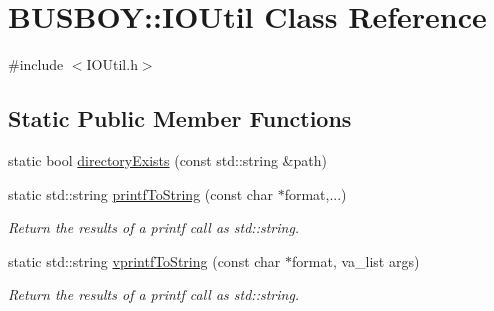 \hypertarget{classBUSBOY_1_1IOUtil}{
\section{BUSBOY::IOUtil Class Reference}
\label{classBUSBOY_1_1IOUtil}
}


{\ttfamily \#include $<$IOUtil.h$>$}\subsection*{Static Public Member Functions}
\begin{DoxyCompactItemize}
\item 
static bool \hyperlink{classBUSBOY_1_1IOUtil_a6633f30f20c2587d6b91277a90928bbf}{directoryExists} (const std::string \&path)
\item 
static std::string \hyperlink{classBUSBOY_1_1IOUtil_ac2f27ba807ecb6be70fac841e5070e20}{printfToString} (const char $\ast$format,...)
\begin{DoxyCompactList}\small\item\em Return the results of a printf call as std::string. \item\end{DoxyCompactList}\item 
static std::string \hyperlink{classBUSBOY_1_1IOUtil_a10abc24ad79294cde2c9237e5bce59cc}{vprintfToString} (const char $\ast$format, va\_\-list args)
\begin{DoxyCompactList}\small\item\em Return the results of a printf call as std::string. \item\end{DoxyCompactList}\end{DoxyCompactItemize}


